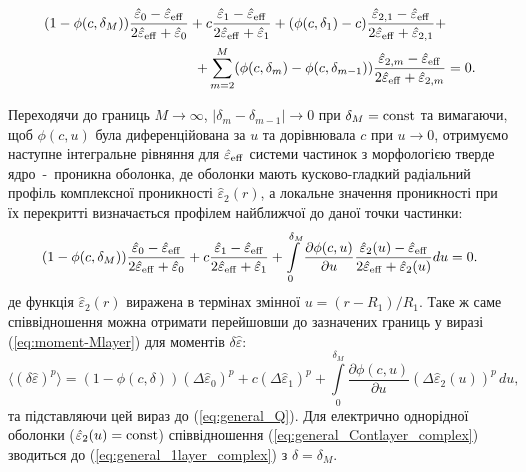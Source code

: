 \documentclass[14pt,twoside]{vakthesis}
\begin{document}
\begin{equation}\label{eq:general_Mlayer_complex}
\begin{split}
(1 - \phi(c,\delta_M)) \frac{\hat{\varepsilon}_0 - \hat{\varepsilon}_{\rm eff}}{2\hat{\varepsilon}_{\rm eff} + \hat{\varepsilon}_0}
+ c \frac{\hat{\varepsilon}_1 - \hat{\varepsilon}_{\rm eff}}{2\hat{\varepsilon}_{\rm eff} + \hat{\varepsilon}_1} + (\phi(c,\delta_1)-c) \frac{\hat{\varepsilon}_{2,1} - \hat{\varepsilon}_{\rm eff}}{2\hat{\varepsilon}_{\rm eff} + \hat{\varepsilon}_{2,1}} +& \\
+ \sum\limits_{m=2}^{M} (\phi(c,\delta_m)-\phi(c,\delta_{m-1})) \frac{\hat{\varepsilon}_{2,m} - \hat{\varepsilon}_{\rm eff}}{2\hat{\varepsilon}_{\rm eff} + \hat{\varepsilon}_{2,m}} &= 0.
\end{split}
\end{equation}

Переходячи до границь $M \to \infty$, $|\delta_{m} - \delta_{m-1}| \to 0$ при $\delta_M = {\rm const}$ та вимагаючи, щоб $\phi (c, u)$ була диференційована за $u$ та дорівнювала $c$ при $u\to 0$, отримуємо наступне інтегральне рівняння для $\hat{\varepsilon}_{\rm eff}$ системи частинок з морфологією тверде ядро~-~проникна оболонка, де оболонки мають кусково-гладкий радіальний профіль комплексної проникності $\hat{\varepsilon}_{2} (r)$, а локальне значення проникності при їх перекритті визначається профілем найближчої до даної точки частинки:
\begin{equation}\label{eq:general_Contlayer_complex}
(1 - \phi(c,\delta_M)) \frac{\hat{\varepsilon}_0 - \hat{\varepsilon}_{\rm eff}}{2\hat{\varepsilon}_{\rm eff} + \hat{\varepsilon}_0}
+ c \frac{\hat{\varepsilon}_1 - \hat{\varepsilon}_{\rm eff}}{2\hat{\varepsilon}_{\rm eff} + \hat{\varepsilon}_1}
+ \int\limits_0^{\delta_M} \frac{\partial \phi(c,u)}{\partial u} \frac{\hat{\varepsilon}_2 (u) - \hat{\varepsilon}_{\rm eff}}{2\hat{\varepsilon}_{\rm eff} + \hat{\varepsilon}_2 (u)} du = 0.
\end{equation}
де функція $\hat{\varepsilon}_2 (r)$ виражена в термінах змінної $u = (r - R_1)/R_1$.
Таке ж саме співвідношення можна отримати перейшовши до зазначених границь у виразі (\ref{eq:moment-Mlayer}) для моментів $\delta\hat{\varepsilon}$:
\begin{equation}\label{eq:moment-integral}
\langle (\delta\hat{\varepsilon})^p \rangle = 
(1 - \phi(c,\delta)) (\Delta\hat{\varepsilon}_0)^p + 
c (\Delta\hat{\varepsilon}_1)^p + 
\int\limits_{0}^{\delta_M} \frac{\partial \phi(c,u)}{\partial u} (\Delta\hat{\varepsilon}_2 (u))^p \, du,
\end{equation}
та підставляючи цей вираз до (\ref{eq:general_Q}).
Для електрично однорідної оболонки ($\hat{\varepsilon}_2 (u) = {\rm const}$) співвідношення (\ref{eq:general_Contlayer_complex}) зводиться до (\ref{eq:general_1layer_complex}) з $\delta = \delta_M$.
\end{document}
